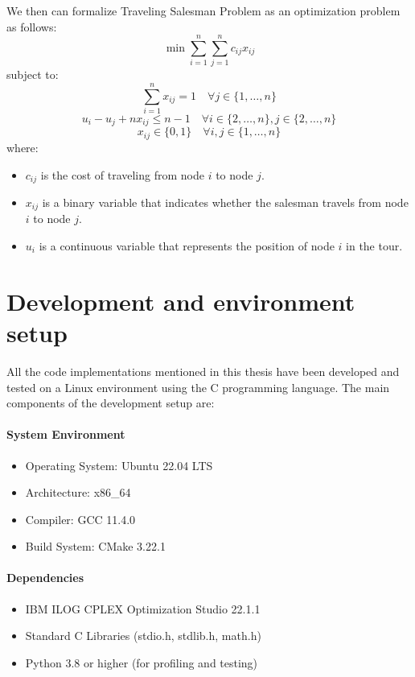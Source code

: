 \documentclass{article}
\begin{document}
We then can formalize Traveling Salesman Problem  as an optimization problem as follows:
\begin{equation}
	\min \sum_{i=1}^{n} \sum_{j=1}^{n} c_{ij} x_{ij}
\end{equation}
subject to:
\begin{equation}
	\sum_{i=1}^{n} x_{ij} = 1 \quad \forall j \in \{1, \ldots, n\}
\end{equation}
\begin{equation}
	u_i - u_j + nx_{ij} \leq n-1 \quad \forall i \in \{2, \ldots, n\}, j \in \{2, \ldots, n\}
\end{equation}
\begin{equation}
	x_{ij} \in \{0, 1\} \quad \forall i, j \in \{1, \ldots, n\}
\end{equation}
where:
\begin{itemize}
	\item $c_{ij}$ is the cost of traveling from node $i$ to node $j$.
	\item $x_{ij}$ is a binary variable that indicates whether the salesman travels from node $i$ to node $j$.
	\item $u_i$ is a continuous variable that represents the position of node $i$ in the tour.
\end{itemize}


\newpage

\section{Development and environment setup}
All the code implementations mentioned in this thesis have been developed and tested on a Linux environment using the C programming language. The main components of the development setup are:

\paragraph{System Environment}
\begin{itemize}
	\item Operating System: Ubuntu 22.04 LTS
	\item Architecture: x86\_64
	\item Compiler: GCC 11.4.0
	\item Build System: CMake 3.22.1
\end{itemize}

\paragraph{Dependencies}
\begin{itemize}
	\item IBM ILOG CPLEX Optimization Studio 22.1.1
	\item Standard C Libraries (stdio.h, stdlib.h, math.h)
	\item Python 3.8 or higher (for profiling and testing)
\end{itemize}
\end{document}
